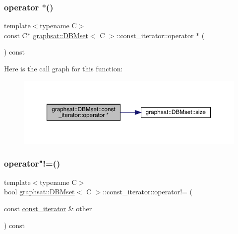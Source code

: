 \subsubsection{\texorpdfstring{operator $\ast$()}{operator *()}}
{\footnotesize\ttfamily template$<$typename C$>$ \\
const C$\ast$ \mbox{\hyperlink{classgraphsat_1_1_d_b_mset}{graphsat\+::\+D\+B\+Mset}}$<$ C $>$\+::const\+\_\+iterator\+::operator $\ast$ (\begin{DoxyParamCaption}{ }\end{DoxyParamCaption}) const\hspace{0.3cm}{\ttfamily [inline]}}

Here is the call graph for this function\+:
\nopagebreak
\begin{figure}[H]
\begin{center}
\leavevmode
\includegraphics[width=350pt]{classgraphsat_1_1_d_b_mset_1_1const__iterator_acbf30d7be409b9b4806fd0594eaf95be_cgraph}
\end{center}
\end{figure}
\mbox{\label{classgraphsat_1_1_d_b_mset_1_1const__iterator_adda5b4d34e61f8c9bb053729ee028c45}} 
\subsubsection{\texorpdfstring{operator"!=()}{operator!=()}}
{\footnotesize\ttfamily template$<$typename C$>$ \\
bool \mbox{\hyperlink{classgraphsat_1_1_d_b_mset}{graphsat\+::\+D\+B\+Mset}}$<$ C $>$\+::const\+\_\+iterator\+::operator!= (\begin{DoxyParamCaption}\item[{const \mbox{\hyperlink{classgraphsat_1_1_d_b_mset_1_1const__iterator}{const\+\_\+iterator}} \&}]{other }\end{DoxyParamCaption}) const\hspace{0.3cm}{\ttfamily [inline]}}

